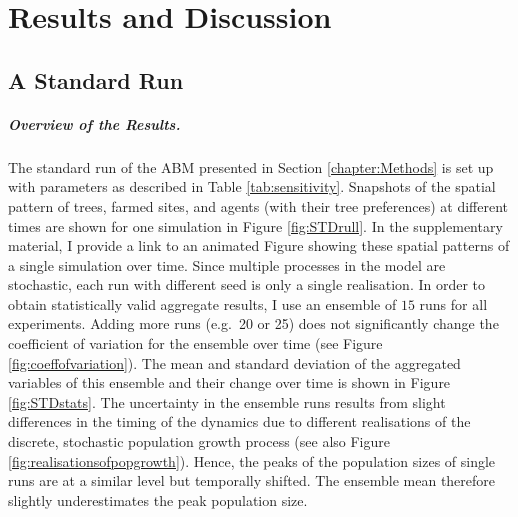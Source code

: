 \chapter{Results and Discussion}\label{chapter:Results}
\FloatBarrier
\section{A Standard Run}
\paragraph{Overview of the Results.}
The standard run of the ABM presented in Section \ref{chapter:Methods} 
is set up with parameters as described in Table \ref{tab:sensitivity}.
Snapshots of the spatial pattern of trees, farmed sites, and agents (with their tree preferences) at different times are shown for one simulation in Figure \ref{fig:STDrull}.
In the supplementary material, I provide a link to an animated Figure showing these spatial patterns of a single simulation over time.
Since multiple processes in the model are stochastic, each run with different seed is only a single realisation.
In order to obtain statistically valid aggregate results, I use an ensemble of $15$ runs for all experiments.
Adding more runs (e.g.\ 20 or 25) does not significantly change the coefficient of variation for the ensemble over time (see Figure \ref{fig:coeffofvariation}).
The mean and standard deviation of the aggregated variables of this ensemble and their change over time is shown in Figure \ref{fig:STDstats}.
The uncertainty in the ensemble runs results from slight differences in the timing of the dynamics due to different realisations of the discrete, stochastic population growth process (see also Figure \ref{fig:realisationsofpopgrowth}). 
Hence, the peaks of the population sizes of single runs are at a similar level but temporally shifted. 
The ensemble mean therefore slightly underestimates the peak population size.

